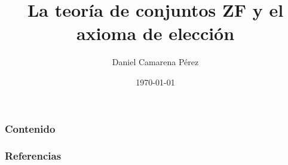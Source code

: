 \documentclass[12pt]{beamer} %
\title[Elección y matemática]{La teoría de conjuntos ZF y el axioma de elección}
\author[Daniel Camarena]{Daniel Camarena Pérez} %
\institute[UNI]{Universidad Nacional de Ingeniería}
\date{\today} %
\begin{document}

\begin{frame}[plain] %
\titlepage 
\end{frame}

\begin{frame}[allowframebreaks]
\frametitle{Contenido} %
\tableofcontents 
\end{frame}







\begin{frame}[allowframebreaks]
\frametitle{Referencias}


\end{frame}

\begin{frame}
\end{frame}
\end{document}
